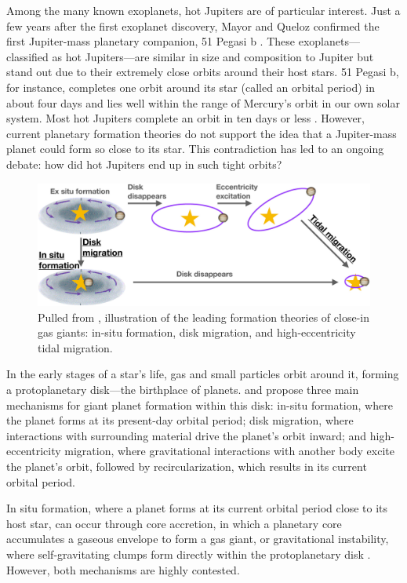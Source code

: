 \documentclass[oneside,12pt]{amsart}
\numberwithin{page}{section}
\begin{document}
Among the many known exoplanets, hot Jupiters are of particular interest. Just a few years after the first exoplanet discovery, Mayor and Queloz confirmed the first Jupiter-mass planetary companion, 51 Pegasi b \citep{mayor1995pegasi51b}. These exoplanets—classified as hot Jupiters—are similar in size and composition to Jupiter but stand out due to their extremely close orbits around their host stars. 51 Pegasi b, for instance, completes one orbit around its star (called an orbital period) in about four days and lies well within the range of Mercury’s orbit in our own solar system. Most hot Jupiters complete an orbit in ten days or less \citep{fortney2021hotjupiters}. However, current planetary formation theories do not support the idea that a Jupiter-mass planet could form so close to its star. This contradiction has led to an ongoing debate: how did hot Jupiters end up in such tight orbits?

\begin{figure}[htbp]
    \centering
    \includegraphics[width=\linewidth]{figs/hj_formation_theories.jpg}
    \caption{Pulled from \citet{fortney2021hotjupiters}, illustration of the leading formation theories of close-in gas giants: in-situ formation, disk migration, and high-eccentricity tidal migration.}
    \label{fig:formation-theories}
\end{figure}

In the early stages of a star's life, gas and small particles orbit around it, forming a protoplanetary disk—the birthplace of planets. \citet{fortney2021hotjupiters} and \citet{dawson2018origins} propose three main mechanisms for giant planet formation within this disk: in-situ formation, where the planet forms at its present-day orbital period; disk migration, where interactions with surrounding material drive the planet’s orbit inward; and high-eccentricity migration, where gravitational interactions with another body excite the planet’s orbit, followed by recircularization, which results in its current orbital period.

In situ formation, where a planet forms at its current orbital period close to its host star, can occur through core accretion, in which a planetary core accumulates a gaseous envelope to form a gas giant, or gravitational instability, where self-gravitating clumps form directly within the protoplanetary disk \citep{helled2013giant}. However, both mechanisms are highly contested.
\end{document}
